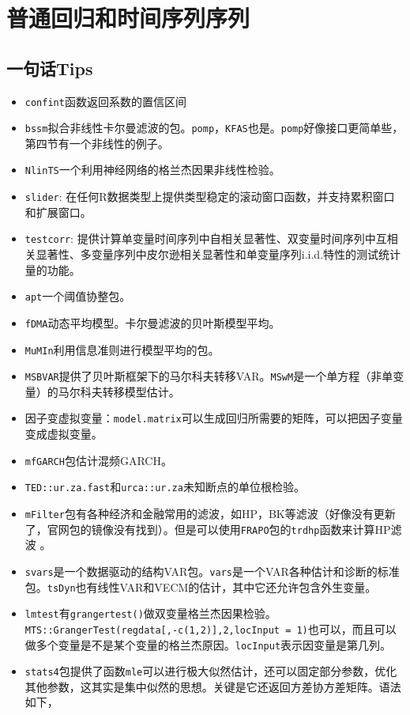\documentclass[
]{book}
\providecommand{\tightlist}{%
  \setlength{\itemsep}{0pt}\setlength{\parskip}{0pt}}
\begin{document}
\hypertarget{TS}{%
\chapter{普通回归和时间序列序列}\label{TS}}

\hypertarget{ux4e00ux53e5ux8bddtips-1}{%
\section{一句话Tips}\label{ux4e00ux53e5ux8bddtips-1}}

\begin{itemize}
\tightlist
\item
  \texttt{confint}函数返回系数的置信区间
\item
  \texttt{bssm}拟合非线性卡尔曼滤波的包。\texttt{pomp}，\texttt{KFAS}也是。\texttt{pomp}好像接口更简单些，第四节有一个非线性的例子。
\item
  \texttt{NlinTS}一个利用神经网络的格兰杰因果非线性检验。
\item
  \texttt{slider}: 在任何R数据类型上提供类型稳定的滚动窗口函数，并支持累积窗口和扩展窗口。
\item
  \texttt{testcorr}: 提供计算单变量时间序列中自相关显著性、双变量时间序列中互相关显著性、多变量序列中皮尔逊相关显著性和单变量序列i.i.d.特性的测试统计量的功能。\\
\item
  \texttt{apt}一个阈值协整包。
\item
  \texttt{fDMA}动态平均模型。卡尔曼滤波的贝叶斯模型平均。
\item
  \texttt{MuMIn}利用信息准则进行模型平均的包。
\item
  \texttt{MSBVAR}提供了贝叶斯框架下的马尔科夫转移VAR。\texttt{MSwM}是一个单方程（非单变量）的马尔科夫转移模型估计。
\item
  因子变虚拟变量：\texttt{model.matrix}可以生成回归所需要的矩阵，可以把因子变量变成虚拟变量。
\item
  \texttt{mfGARCH}包估计混频GARCH。
\item
  \texttt{TED::ur.za.fast}和\texttt{urca::ur.za}未知断点的单位根检验。
\item
  \texttt{mFilter}包有各种经济和金融常用的滤波，如HP，BK等滤波（好像没有更新了，官网包的镜像没有找到）。但是可以使用\texttt{FRAPO}包的\texttt{trdhp}函数来计算HP滤波 。
\item
  \texttt{svars}是一个数据驱动的结构VAR包。\texttt{vars}是一个VAR各种估计和诊断的标准包。\texttt{tsDyn}也有线性VAR和VECM的估计，其中它还允许包含外生变量。
\item
  \texttt{lmtest}有\texttt{grangertest()}做双变量格兰杰因果检验。\texttt{MTS::GrangerTest(regdata{[},-c(1,2){]},2,locInput\ =\ 1)}也可以，而且可以做多个变量是不是某个变量的格兰杰原因。\texttt{locInput}表示因变量是第几列。
\item
  \texttt{stats4}包提供了函数\texttt{mle}可以进行极大似然估计，还可以固定部分参数，优化其他参数，这其实是集中似然的思想。关键是它还返回方差协方差矩阵。语法如下，
\end{itemize}
\end{document}

